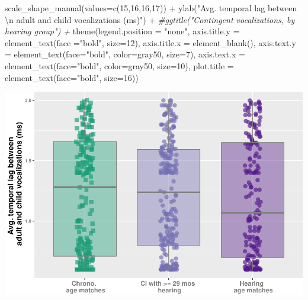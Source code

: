 \documentclass[
]{article}
\newenvironment{Shaded}{\begin{snugshade}}{\end{snugshade}}
\newcommand{\AttributeTok}[1]{\textcolor[rgb]{0.77,0.63,0.00}{#1}}
\newcommand{\CommentTok}[1]{\textcolor[rgb]{0.56,0.35,0.01}{\textit{#1}}}
\newcommand{\DecValTok}[1]{\textcolor[rgb]{0.00,0.00,0.81}{#1}}
\newcommand{\FunctionTok}[1]{\textcolor[rgb]{0.00,0.00,0.00}{#1}}
\newcommand{\NormalTok}[1]{#1}
\newcommand{\SpecialCharTok}[1]{\textcolor[rgb]{0.00,0.00,0.00}{#1}}
\newcommand{\StringTok}[1]{\textcolor[rgb]{0.31,0.60,0.02}{#1}}
\begin{document}
\begin{Shaded}
\begin{Highlighting}[]
  \FunctionTok{scale\_shape\_manual}\NormalTok{(}\AttributeTok{values=}\FunctionTok{c}\NormalTok{(}\DecValTok{15}\NormalTok{,}\DecValTok{16}\NormalTok{,}\DecValTok{16}\NormalTok{,}\DecValTok{17}\NormalTok{)) }\SpecialCharTok{+}
  \FunctionTok{ylab}\NormalTok{(}\StringTok{"Avg. temporal lag between }\SpecialCharTok{\textbackslash{}n}\StringTok{ adult and child vocalizations (ms)"}\NormalTok{) }\SpecialCharTok{+} 
  \CommentTok{\#ggtitle("Contingent vocalizations, by hearing group") + }
  \FunctionTok{theme}\NormalTok{(}\AttributeTok{legend.position =} \StringTok{"none"}\NormalTok{,}
        \AttributeTok{axis.title.y =} \FunctionTok{element\_text}\NormalTok{(}\AttributeTok{face =}\StringTok{"bold"}\NormalTok{, }\AttributeTok{size=}\DecValTok{12}\NormalTok{),}
        \AttributeTok{axis.title.x =} \FunctionTok{element\_blank}\NormalTok{(),}
        \AttributeTok{axis.text.y =} \FunctionTok{element\_text}\NormalTok{(}\AttributeTok{face=}\StringTok{"bold"}\NormalTok{, }\AttributeTok{color=}\StringTok{\textquotesingle{}gray50\textquotesingle{}}\NormalTok{, }\AttributeTok{size=}\DecValTok{7}\NormalTok{),}
        \AttributeTok{axis.text.x =} \FunctionTok{element\_text}\NormalTok{(}\AttributeTok{face=}\StringTok{"bold"}\NormalTok{, }\AttributeTok{color=}\StringTok{\textquotesingle{}gray50\textquotesingle{}}\NormalTok{, }\AttributeTok{size=}\DecValTok{10}\NormalTok{),}
        \AttributeTok{plot.title =} \FunctionTok{element\_text}\NormalTok{(}\AttributeTok{face=}\StringTok{"bold"}\NormalTok{, }\AttributeTok{size=}\DecValTok{16}\NormalTok{))}
\end{Highlighting}
\end{Shaded}

\includegraphics{everyday_CI_files/figure-latex/visualize temporal dyanmics by hearing group-1.pdf}
\end{document}
